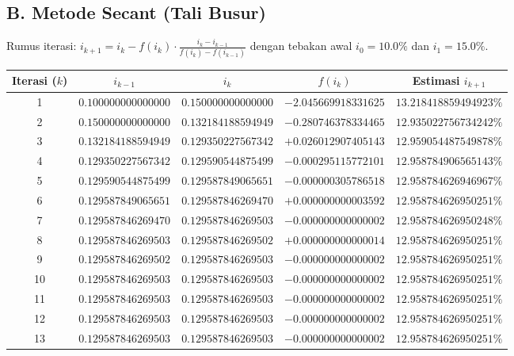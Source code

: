 \documentclass[11pt,a4paper]{article}
\begin{document}
\subsection*{B. Metode Secant (Tali Busur)}
Rumus iterasi: $i_{k+1} = i_k - f(i_k) \cdot \frac{i_k - i_{k-1}}{f(i_k) - f(i_{k-1})}$ dengan tebakan awal $i_0 = 10.0\%$ dan $i_1 = 15.0\%$.

\begin{center}
\footnotesize
\setlength{\tabcolsep}{4pt}
\begin{tabular}{ccccc}
\toprule
\textbf{Iterasi ($k$)} & \textbf{$i_{k-1}$} & \textbf{$i_k$} & \textbf{$f(i_k)$} & \textbf{Estimasi $i_{k+1}$} \\
\midrule
1 & $0.100000000000000$ & $0.150000000000000$ & $-2.045669918331625$ & $13.218418859494923\%$ \\
2 & $0.150000000000000$ & $0.132184188594949$ & $-0.280746378334465$ & $12.935022756734242\%$ \\
3 & $0.132184188594949$ & $0.129350227567342$ & $+0.026012907405143$ & $12.959054487549878\%$ \\
4 & $0.129350227567342$ & $0.129590544875499$ & $-0.000295115772101$ & $12.958784906565143\%$ \\
5 & $0.129590544875499$ & $0.129587849065651$ & $-0.000000305786518$ & $12.958784626946967\%$ \\
6 & $0.129587849065651$ & $0.129587846269470$ & $+0.000000000003592$ & $12.958784626950251\%$ \\
7 & $0.129587846269470$ & $0.129587846269503$ & $-0.000000000000002$ & $12.958784626950248\%$ \\
8 & $0.129587846269503$ & $0.129587846269502$ & $+0.000000000000014$ & $12.958784626950251\%$ \\
9 & $0.129587846269502$ & $0.129587846269503$ & $-0.000000000000002$ & $12.958784626950251\%$ \\
10 & $0.129587846269503$ & $0.129587846269503$ & $-0.000000000000002$ & $12.958784626950251\%$ \\
11 & $0.129587846269503$ & $0.129587846269503$ & $-0.000000000000002$ & $12.958784626950251\%$ \\
12 & $0.129587846269503$ & $0.129587846269503$ & $-0.000000000000002$ & $12.958784626950251\%$ \\
13 & $0.129587846269503$ & $0.129587846269503$ & $-0.000000000000002$ & $\mathbf{12.958784626950251\%}$ \\
\bottomrule
\end{tabular}
\end{center}
\end{document}
